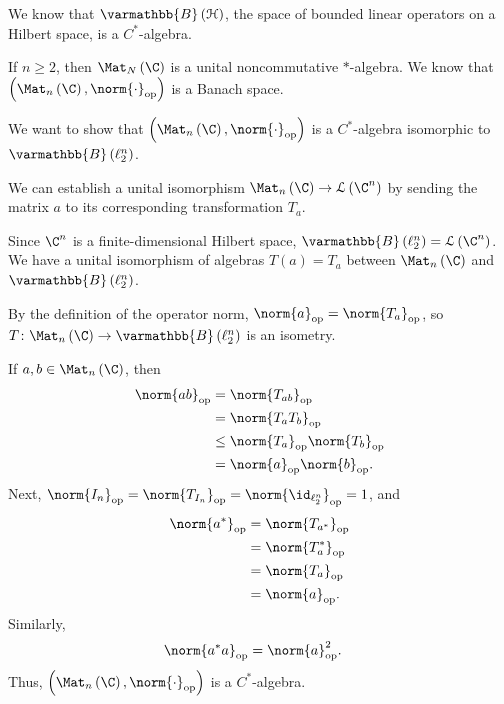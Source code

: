 \documentclass[10pt]{mypackage}
\renewcommand*{\mathbb}[1]{\varmathbb{#1}}
\newcommand{\B}{\mathbb{B}}
\begin{document}
\begin{example}
  We know that $\B\left(\mathcal{H}\right)$, the space of bounded linear operators on a Hilbert space, is a $C^{\ast}$-algebra.
\end{example}
\begin{example}
  If $n\geq 2$, then $\Mat_N\left(\C\right)$ is a unital noncommutative $\ast$-algebra. We know that $\left(\Mat_n\left(\C\right),\norm{\cdot}_{\text{op}}\right)$ is a Banach space.\newline

  We want to show that $\left(\Mat_n\left(\C\right),\norm{\cdot}_{\text{op}}\right)$ is a $C^{\ast}$-algebra isomorphic to $\B\left(\ell_2^{n}\right)$.\newline

  We can establish a unital isomorphism $\Mat_n\left(\C\right)\rightarrow \mathcal{L}\left(\C^n\right)$ by sending the matrix $a$ to its corresponding transformation $T_a$.\newline

  Since $\C^n$ is a finite-dimensional Hilbert space, $\B\left(\ell_2^n\right) = \mathcal{L}\left(\C^n\right)$. We have a unital isomorphism of algebras $T\left(a\right) = T_a$ between $\Mat_n\left(\C\right)$ and $\B\left(\ell_2^n\right)$.\newline

  By the definition of the operator norm, $\norm{a}_{\text{op}} = \norm{T_a}_{\text{op}}$, so $T\colon \Mat_n\left(\C\right)\rightarrow \B\left(\ell_2^n\right)$ is an isometry.\newline

  If $a,b\in \Mat_n\left(\C\right)$, then
  \begin{align*}
    \norm{ab}_{\text{op}} &= \norm{T_{ab}}_{\text{op}}\\
                          &= \norm{T_aT_b}_{\text{op}}\\
                          &\leq \norm{T_a}_{\text{op}}\norm{T_b}_{\text{op}}\\
                          &= \norm{a}_{\text{op}}\norm{b}_{\text{op}}.
  \end{align*}
  Next, $\norm{I_n}_{\text{op}}=\norm{T_{I_n}}_{\text{op}} = \norm{\id_{\ell_2^n}}_{\text{op}} = 1$, and
  \begin{align*}
    \norm{a^{\ast}}_{\text{op}} &= \norm{T_{a^{\ast}}}_{\text{op}}\\
                                &= \norm{T_{a}^{\ast}}_{\text{op}}\\
                                &= \norm{T_a}_{\text{op}}\\
                                &= \norm{a}_{\text{op}}.
  \end{align*}
  Similarly,
  \begin{align*}
    \norm{a^{\ast}a}_{\text{op}} &= \norm{a}_{\text{op}}^2.
  \end{align*}
  Thus, $\left(\Mat_n\left(\C\right),\norm{\cdot}_{\text{op}}\right)$ is a $C^{\ast}$-algebra.
\end{example}
\end{document}
